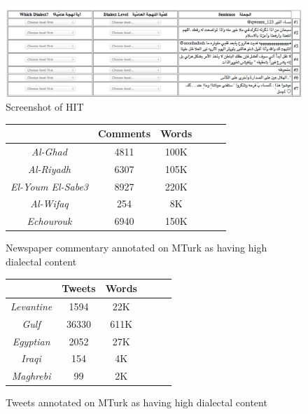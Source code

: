 \documentclass[10pt, a4paper]{article}
\begin{document}

\begin{figure}
\centering
\setlength\fboxsep{0pt}
\setlength\fboxrule{0.25pt}
  \includegraphics[width=1.00\linewidth ]{figs/hit_screenshot}	
\caption{Screenshot of HIT}
\label{f7}
\end{figure}



\begin{figure}
\centering
\begin{tabular}{|c|c|c|c|c|c|} \hline 
& Comments & Words \\ \hline 
\textit{Al-Ghad} & 4811 & 100K \\ \hline
\textit{Al-Riyadh} & 6307 & 105K \\ \hline
\textit{El-Youm El-Sabe3} & 8927 & 220K \\ \hline
\textit{Al-Wifaq} & 254 & 8K \\ \hline
\textit{Echourouk} & 6940 & 150K \\ \hline
\end{tabular}
\caption{Newspaper commentary annotated on MTurk as having high dialectal content}
\end{figure}


\begin{figure}
\centering
\begin{tabular}{|c|c|c|c|c|c|} \hline 
& Tweets & Words \\ \hline 
\textit{Levantine} & 1594 & 22K \\ \hline
\textit{Gulf} & 36330 & 611K \\ \hline
\textit{Egyptian} & 2052 & 27K \\ \hline
\textit{Iraqi} & 154 & 4K \\ \hline
\textit{Maghrebi} & 99 & 2K \\ \hline
\end{tabular}
\caption{Tweets annotated on MTurk as having high dialectal content}
\end{figure}
\end{document}
